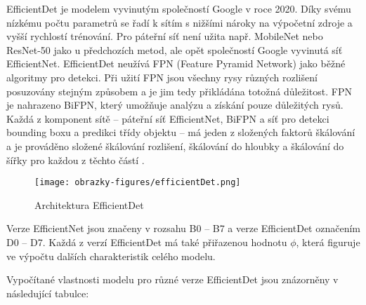 EfficientDet je modelem vyvinutým společností Google v roce 2020. Díky svému nízkému počtu parametrů se řadí k sítím s nižšími nároky na výpočetní zdroje a vyšší rychlostí trénování. Pro páteřní síť není užita např. MobileNet nebo ResNet-50 jako u předchozích metod, ale opět společností Google vyvinutá síť EfficientNet. EfficientDet neužívá FPN (Feature Pyramid Network) jako běžné algoritmy pro detekci. Při užití FPN jsou všechny rysy různých rozlišení posuzovány stejným způsobem a je jim tedy přikládána totožná důležitost. FPN je nahrazeno BiFPN, který umožňuje analýzu a získání pouze důležitých rysů. Každá z komponent sítě -- páteřní síť EfficientNet, BiFPN a síť pro detekci bounding boxu a predikci třídy objektu -- má jeden z složených faktorů škálování a je prováděno složené škálování rozlišení, škálování do hloubky a škálování do šířky pro každou z těchto částí \cite{EfficientDet, EfficientDetBlog}.

\begin{figure}[!htbp]
    \centering
    \texttt{[image: obrazky-figures/efficientDet.png]}
    \caption{Architektura EfficientDet \cite{EfficientDet}}
\end{figure} 

Verze EfficientNet jsou značeny v rozsahu B0 -- B7 a verze EfficientDet označením D0 -- D7. Každá z verzí EfficientDet má také přiřazenou hodnotu $\phi$, která figuruje ve výpočtu dalších charakteristik celého modelu. 

\iffalse
Vypočítané vlastnosti modelu pro různé verze EfficientDet jsou znázorněny v následující tabulce:

